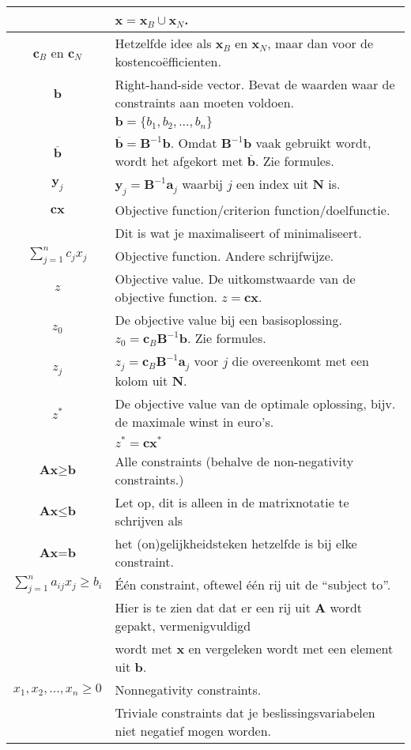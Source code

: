 \documentclass[10pt,a4paper]{article}
\begin{document}
\begin{tabular}{|c|l|}
 & $\textbf{x} = \textbf{x}_B \cup \textbf{x}_N$. \\
\hline
$\textbf{c}_B$ en $\textbf{c}_N$ & Hetzelfde idee als $\textbf{x}_B$ en $\textbf{x}_N$, maar dan voor de kostencoëfficienten. \\
\hline
$\textbf{b}$ & Right-hand-side vector. Bevat de waarden waar de constraints aan moeten voldoen.\\
 & $\textbf{b} = \{b_1, b_2, ..., b_n\}$\\
\hline
$\overline{\textbf{b}}$ & $\overline{\textbf{b}} = \textbf{B}^{-1}\textbf{b}$. Omdat $\textbf{B}^{-1}\textbf{b}$ vaak gebruikt wordt, wordt het afgekort met $\overline{\textbf{b}}$. Zie formules. \\
\hline
$\textbf{y}_j$ & $\textbf{y}_j = \textbf{B}^{-1}\textbf{a}_j$ waarbij $j$ een index uit $\textbf{N}$ is. \\
\hline
$\textbf{cx}$ & Objective function/criterion function/doelfunctie. \\ & 	Dit is wat je maximaliseert of minimaliseert.\\
\hline
$\displaystyle\sum\limits_{j=1}^n c_jx_j$ & Objective function. Andere schrijfwijze. \\
\hline
$z$ & Objective value. De uitkomstwaarde van de objective function. $z = \textbf{cx}$.\\
\hline
$z_0$ & De objective value bij een basisoplossing. $z_0 = \textbf{c}_B\textbf{B}^{-1}\textbf{b}$. Zie formules. \\
\hline
$z_j$ & $z_j = \textbf{c}_B\textbf{B}^{-1}\textbf{a}_j$ voor $j$ die overeenkomt met een kolom uit $\textbf{N}$. \\
\hline
$z^*$ & De objective value van de optimale oplossing, bijv. de maximale winst in euro's. \\ %
 & $z^* = \textbf{cx}^*$ \\
\hline
$\textbf{Ax} \geq \textbf{b}$ & Alle constraints (behalve de non-negativity constraints.)\\
$\textbf{Ax} \leq \textbf{b}$ & Let op, dit is alleen in de matrixnotatie te schrijven als \\
$\textbf{Ax} = \textbf{b}$ & het (on)gelijkheidsteken hetzelfde is bij elke constraint.\\
\hline
$\displaystyle\sum\limits_{j=1}^n a_{ij}x_j \ge b_i$ & Één constraint, oftewel één rij uit de ``subject to''.\\
 & Hier is te zien dat dat er een rij uit $\textbf{A}$ wordt gepakt, vermenigvuldigd \\ &  wordt met $\textbf{x}$ en vergeleken wordt met een element uit $\textbf{b}$. \\
\hline
$x_1, x_2, ..., x_n \geq 0$ & Nonnegativity constraints. \\ & Triviale constraints dat je beslissingsvariabelen niet negatief mogen worden.\\
\hline
\end{tabular}
\end{document}

